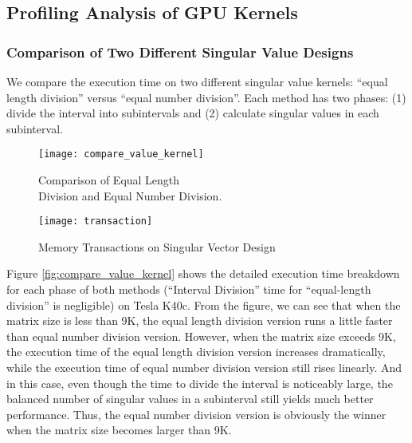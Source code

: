 \vspace{-0.1in}
\subsection{Profiling Analysis of GPU Kernels}
\vspace{-0.1in}

\subsubsection{Comparison of Two Different Singular Value Designs}
We compare the execution time on two different singular value kernels:
``equal length division'' versus ``equal number division''. Each
method has two phases: (1) divide the interval into subintervals and
(2) calculate singular values in each subinterval.
\begin{figure}[hbpt]
\vspace{-0.3in}
\begin{minipage}[t]{0.5\linewidth}
\centering
\texttt{[image: compare\_value\_kernel]}
\vspace{-0.1in}
\caption{Comparison of Equal Length \protect\\ Division and Equal Number Division.}
\label{fig:compare_value_kernel}
\end{minipage}%
\begin{minipage}[t]{0.5\linewidth}
\centering
\texttt{[image: transaction]}
\vspace{-0.1in}
\caption{Memory Transactions on Singular Vector Design}
\label{fig:transaction}
\end{minipage}
\vspace{-0.2in}
\end{figure}
Figure \ref{fig:compare_value_kernel} shows the detailed execution time breakdown for each phase of both methods (``Interval Division'' time for ``equal-length division'' is negligible) on Tesla K40c.
From the figure, we can see that when the matrix size is less than 9K, the equal length division version runs a little faster than equal number division version.
However, when the matrix size exceeds 9K, the execution time of the equal length division version increases dramatically, while the execution time of equal number division version still rises linearly.
And in this case, 
even though the time to divide the interval is noticeably
large, the balanced number of singular values in a subinterval
still yields much better performance.
Thus, the equal number division version is obviously the winner when the matrix size becomes larger than 9K.

